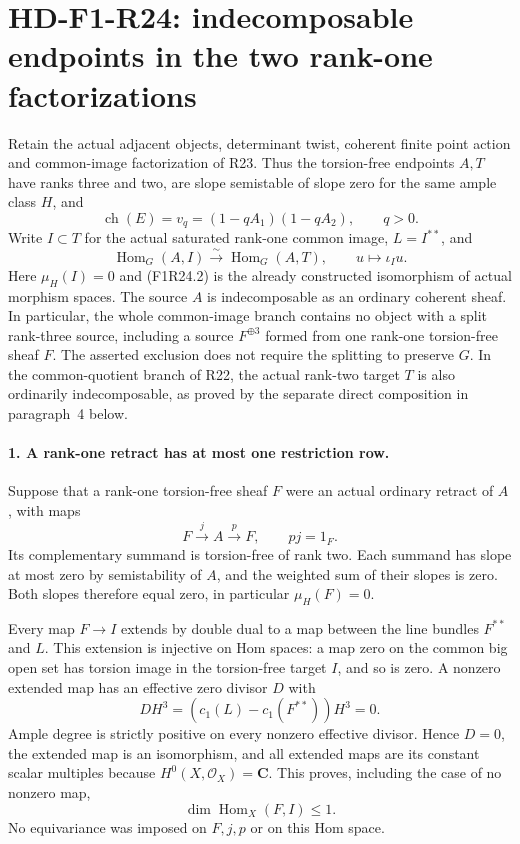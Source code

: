\section[HD-F1-R24: indecomposable endpoints]{HD-F1-R24: indecomposable endpoints in the two rank-one factorizations}
\label{sec:followup-rm-common-image-indecomposable}

Retain the actual adjacent objects, determinant twist, coherent
finite point action and common-image factorization of R23.
Thus the torsion-free endpoints $A,T$ have ranks three and two,
are slope semistable of slope zero for the same ample class $H$,
and
\[
 \operatorname{ch}(E)=v_q=(1-qA_1)(1-qA_2),\qquad q>0.
 \tag{F1R24.1}
\]
Write $I\subset T$ for the actual saturated rank-one common
image, $L=I^{**}$, and
\[
 \operatorname{Hom}_G(A,I)\xrightarrow{\sim}
                  \operatorname{Hom}_G(A,T),\qquad
              u\longmapsto \iota_Iu.
 \tag{F1R24.2}
\]
Here $\mu_H(I)=0$ and (F1R24.2) is the already constructed
isomorphism of actual morphism spaces. The source $A$ is
indecomposable as an ordinary coherent sheaf. In particular,
the whole common-image branch contains no object with a split
rank-three source, including a source $F^{\oplus3}$ formed
from one rank-one torsion-free sheaf $F$. The asserted exclusion
does not require the splitting to preserve $G$. In the
common-quotient branch of R22, the actual rank-two target
$T$ is also ordinarily indecomposable, as proved by the
separate direct composition in paragraph~4 below.

\paragraph{1. A rank-one retract has at most one restriction row.}
Suppose that a rank-one torsion-free sheaf $F$ were an actual
ordinary retract of $A$, with maps
\[
        F\xrightarrow{j}A\xrightarrow{p}F,
                         \qquad pj=1_F.
 \tag{F1R24.3}
\]
Its complementary summand is torsion-free of rank two. Each
summand has slope at most zero by semistability of $A$, and
the weighted sum of their slopes is zero. Both slopes therefore
equal zero, in particular $\mu_H(F)=0$.

Every map $F\to I$ extends by double dual to a map between
the line bundles $F^{**}$ and $L$. This extension is injective
on Hom spaces: a map zero on the common big open set has
torsion image in the torsion-free target $I$, and so is zero.
A nonzero extended map has an effective zero divisor $D$ with
\[
           D H^3=(c_1(L)-c_1(F^{**}))H^3=0.
 \tag{F1R24.4}
\]
Ample degree is strictly positive on every nonzero effective
divisor. Hence $D=0$, the extended map is an isomorphism, and
all extended maps are its constant scalar multiples because
$H^0(X,\mathcal O_X)=\mathbf C$. This proves, including the
case of no nonzero map,
\[
                    \dim\operatorname{Hom}_X(F,I)\le1.
 \tag{F1R24.5}
\]
No equivariance was imposed on $F,j,p$ or on this Hom space.

